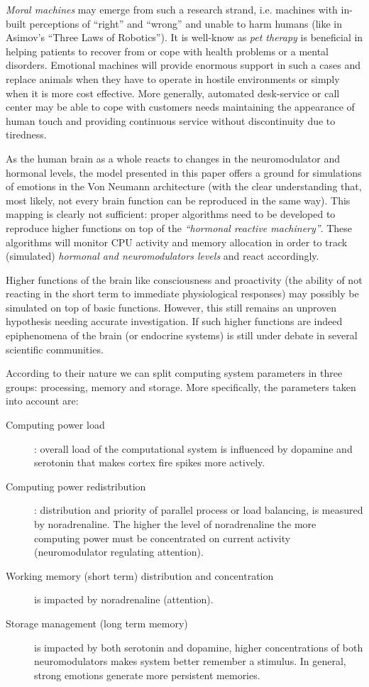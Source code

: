 \documentclass[procedia]{easychair}
\begin{document}
\textit{Moral machines} may emerge from such a research strand, i.e. machines with in-built
perceptions of ``right'' and ``wrong'' and unable to harm humans (like in Asimov's ``Three Laws of Robotics'').
It is well-know as \textit{pet therapy} is beneficial in
helping patients to recover from or cope with health problems or a mental disorders. Emotional
machines will provide enormous support in such a cases and replace animals when they have to operate
in hostile environments or simply when it is more cost effective. More generally, automated desk-service
or call center may be able to cope with customers needs maintaining the appearance of human touch and
providing continuous service without discontinuity due to tiredness.

As the human brain as a whole reacts to changes in the neuromodulator and hormonal levels, the model
presented in this paper offers a ground for simulations of emotions in the Von Neumann architecture
(with the clear understanding that, most likely, not every brain function can be reproduced in the same
way). This mapping is clearly not sufficient: proper algorithms need to be developed to reproduce higher
functions on top of the \textit{``hormonal reactive machinery''}. These algorithms will monitor CPU activity
and memory allocation in order to track (simulated) \textit{hormonal and neuromodulators levels} and react accordingly.

Higher functions of the brain like consciousness and proactivity (the ability of not reacting in the short term
to immediate physiological responses) may possibly be simulated on top of basic functions. However, this
still remains an unproven hypothesis needing accurate investigation. If such higher functions are indeed
epiphenomena of the brain (or endocrine systems) is still under debate in several scientific communities.

According to their nature  we can split computing system parameters in three groups:
processing, memory and storage.
More specifically, the parameters taken into account are:

\begin{description}
 \item[Computing power load]: overall load of the computational system is influenced by dopamine and
serotonin that makes cortex fire spikes more actively.
 \item[Computing power redistribution]: distribution and priority of parallel process or load balancing,
is measured by noradrenaline.
 The higher the level of noradrenaline the more computing power must be concentrated on current activity
(neuromodulator regulating attention).
 \item[Working memory (short term) distribution and concentration] is impacted by noradrenaline (attention).
 \item[Storage management (long term memory)] is impacted by both serotonin and dopamine, higher concentrations of
both neuromodulators makes system better remember a stimulus. In general, strong emotions generate more persistent
memories.
\end{description}
\end{document}
